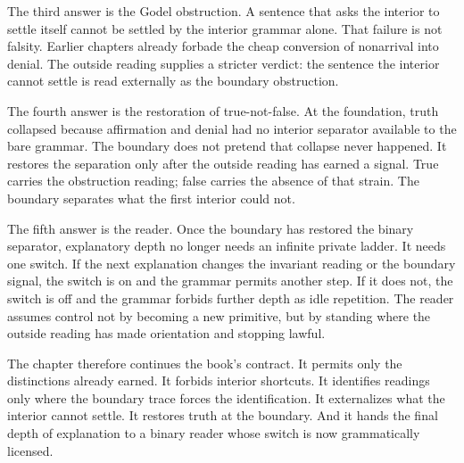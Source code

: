 The third answer is the Godel obstruction. A sentence that asks the interior
to settle itself cannot be settled by the interior grammar alone. That
failure is not falsity. Earlier chapters already forbade the cheap conversion
of nonarrival into denial. The outside reading supplies a stricter verdict:
the sentence the interior cannot settle is read externally as the boundary
obstruction.

The fourth answer is the restoration of true-not-false. At the foundation,
truth collapsed because affirmation and denial had no interior separator
available to the bare grammar. The boundary does not pretend that collapse
never happened. It restores the separation only after the outside reading has
earned a signal. True carries the obstruction reading; false carries the
absence of that strain. The boundary separates what the first interior could
not.

The fifth answer is the reader. Once the boundary has restored the binary
separator, explanatory depth no longer needs an infinite private ladder. It
needs one switch. If the next explanation changes the invariant reading or
the boundary signal, the switch is on and the grammar permits another step.
If it does not, the switch is off and the grammar forbids further depth as
idle repetition. The reader assumes control not by becoming a new primitive,
but by standing where the outside reading has made orientation and stopping
lawful.

The chapter therefore continues the book's contract. It permits only the
distinctions already earned. It forbids interior shortcuts. It identifies
readings only where the boundary trace forces the identification. It
externalizes what the interior cannot settle. It restores truth at the
boundary. And it hands the final depth of explanation to a binary reader
whose switch is now grammatically licensed.
